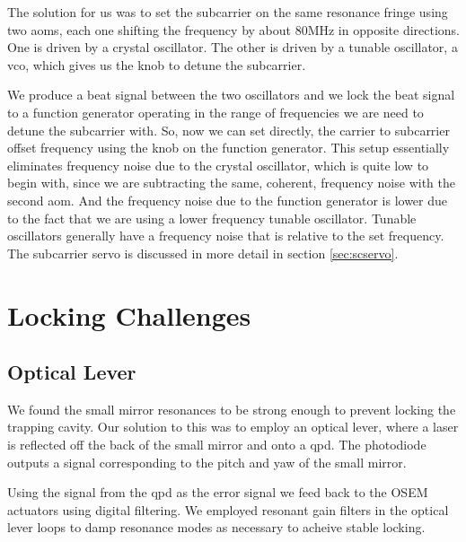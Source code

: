 The solution for us was to set the subcarrier on the same resonance fringe
using two \ac{aom}s, each one shifting the frequency by about 80MHz in
opposite directions.
One is driven by a crystal oscillator.
The other is driven by a tunable oscillator, a \ac{vco}, which gives us the
knob to detune the subcarrier.

We produce a beat signal between the two oscillators and we lock the beat
signal to a function generator operating in the range of frequencies we are
need to detune the subcarrier with. So, now we can set directly, the carrier
to subcarrier offset frequency using the knob on the function generator.
This setup essentially eliminates frequency noise due to the crystal
oscillator, which is quite low to begin with, since we are subtracting the
same, coherent, frequency noise with the second \ac{aom}.
And the frequency noise due to the function generator is lower due to the
fact that we are using a lower frequency tunable oscillator.
Tunable oscillators generally have a frequency noise that is relative to the
set frequency.
The subcarrier servo is discussed in more detail in section
\ref{sec:scservo}.


\section{Locking Challenges}

\subsection{Optical Lever}
We found the small mirror resonances to be strong enough to prevent locking the
trapping cavity. Our solution to this was to employ an optical lever, where a
laser is reflected off the back of the small mirror and onto a \ac{qpd}.
The photodiode outputs a signal corresponding to the pitch and yaw
of the small mirror.

Using the signal from the \ac{qpd} as the error signal we feed back to the
OSEM actuators using digital filtering.
We employed resonant gain filters in the optical lever loops to damp resonance
modes as necessary to acheive stable locking.


